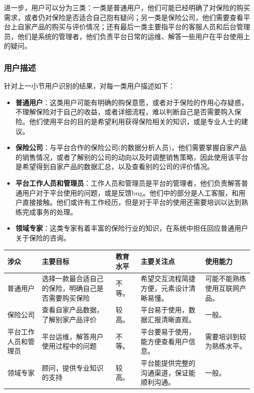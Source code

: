 \documentclass[a4paper]{ctexart}
\begin{document}
进一步，用户可以分为三类：一类是普通用户，他们可能已经明确了对保险的购买需求，或者仍对保险是否适合自己抱有疑问；另一类是保险公司，他们需要查看平台上自家产品的购买与评价情况；还有最后一类主要指平台的客服人员和后台管理员，他们是系统的管理者，他们负责平台日常的运维、解答一些用户在平台使用上的疑问。

\subsubsection{用户描述} 针对上一小节用户识别的结果，对每一类用户描述如下：

\begin{itemize}
  \item \textbf{普通用户}：这类用户可能有明确的购保意愿，或者对于保险的作用心存疑惑，不理解保险对于自己的收益，或者详细流程，难以判断自己是否需要购入保险。他们使用平台的目的是希望利用获得保险相关的知识，或是专业人士的建议。
  \item \textbf{保险公司}：与平台合作的保险公司(的数据分析人员)，他们需要掌握自家产品的销售情况，或者了解别的公司的动向以及时调整销售策略，因此使用该平台是希望得到自家产品的数据汇总，以及查看别的公司的评价情况。
  \item \textbf{平台工作人员和管理员}：工作人员和管理员是平台的管理者，他们负责解答普通用户对于平台使用的问题，或是反馈bug。他们中的部分是人工客服，和用户直接接触。他们或许有工作经历，但是对于平台的使用还需要培训以达到熟练完成事务的处理。
  \item \textbf{领域专家}：这类专家有着丰富的保险行业的知识，在系统中担任回应普通用户关于保险的咨询。

\end{itemize}

\begin{adjustbox}{width=\columnwidth,center}
  \centering
  \begin{tabular}{|m{2cm}|m{3cm}|m{2cm}|m{4cm}|m{3cm}|}
    \hline
    涉众 & 主要目标 & 教育水平 & 主要关注点 & 使用能力 \\
    \hline
    普通用户 & 选择一款最合适自己的保险，明确自己是否需要购买保险 & 不等。 & 希望交互流程简捷方便，元素设计清晰易懂。 & 可能不能熟练使用互联网产品。 \\
    \hline
    保险公司 & 查看自家产品数据，了解别家产品评价 & 较高。 & 平台易于使用，数据汇报清晰直观。 & 一般。 \\
    \hline
    平台工作人员和管理员 & 平台运维，解答用户使用过程中的问题 & 不等。 & 平台要易于使用，能方便查看用户信息。 & 需要培训到较为熟练水平。 \\
    \hline
    领域专家 & 顾问，提供专业知识的支持 & 较高。 & 平台能提供完整的沟通渠道，保证能顺利沟通。 & 一般。 \\
    \hline
  \end{tabular}
\end{adjustbox}
\end{document}
